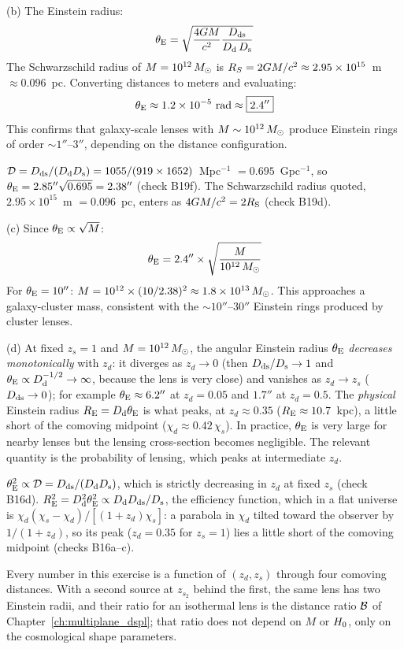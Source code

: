 (b) The Einstein radius:
\[
    \theta_{\mathrm{E}} = \sqrt{\frac{4G M}{c^2}
    \frac{D_{\mathrm{ds}}}{D_{\mathrm{d}}\,D_{\mathrm{s}}}}
\]
The Schwarzschild radius of $M = 10^{12}\,M_{\odot}$ is
$R_S = 2G M / c^2 \approx 2.95 \times 10^{15}$~m
$\approx 0.096$~pc.  Converting distances to meters and evaluating:
\[
    \theta_{\mathrm{E}} \approx 1.2 \times 10^{-5}~\text{rad}
    \approx \boxed{2.4''}
\]
This confirms that galaxy-scale lenses with $M \sim 10^{12}\,M_{\odot}$
produce Einstein rings of order $\sim 1''$--$3''$, depending on the
distance configuration.


\begin{derivation}
$\mathcal D = D_{\mathrm{ds}}/(D_{\mathrm{d}}D_{\mathrm{s}}) = 1055/(919\times1652)$~Mpc$^{-1}$ $= 0.695$~Gpc$^{-1}$,
so $\theta_{\mathrm{E}} = 2.85''\sqrt{0.695} = 2.38''$ (check B19f).  The Schwarzschild
radius quoted, $2.95\times10^{15}$~m $= 0.096$~pc, enters as
$4G M/c^2 = 2R_{\mathrm{S}}$ (check B19d).
\end{derivation}
(c) Since $\theta_{\mathrm{E}} \propto \sqrt{M}$:
\[
    \theta_{\mathrm{E}} = 2.4'' \times \sqrt{\frac{M}{10^{12}\,M_{\odot}}}
\]
For $\theta_{\mathrm{E}} = 10''$: $M = 10^{12} \times (10/2.38)^2 \approx
1.8 \times 10^{13}\,M_{\odot}$.
This approaches a galaxy-cluster mass, consistent with the
$\sim 10''$--$30''$ Einstein rings produced by cluster lenses.

(d) At fixed $z_s = 1$ and $M = 10^{12}\,M_{\odot}$, the angular
Einstein radius $\theta_{\mathrm{E}}$ \emph{decreases monotonically} with $z_d$: it
diverges as $z_d \to 0$ (then $D_{\mathrm{ds}}/D_{\mathrm{s}} \to 1$ and
$\theta_{\mathrm{E}} \propto D_{\mathrm{d}}^{-1/2} \to \infty$, because the lens is very close) and
vanishes as $z_d \to z_s$ ($D_{\mathrm{ds}} \to 0$); for example
$\theta_{\mathrm{E}} \approx 6.2''$ at $z_d = 0.05$ and $1.7''$ at $z_d = 0.5$.  The
\emph{physical} Einstein radius $R_{\mathrm{E}} = D_{\mathrm{d}}\theta_{\mathrm{E}}$ is what peaks, at
$z_d \approx 0.35$ ($R_{\mathrm{E}} \approx 10.7$~kpc), a little short of the comoving
midpoint ($\chi_d \approx 0.42\,\chi_s$).
In practice, $\theta_{\mathrm{E}}$ is very large for nearby lenses but the
lensing cross-section becomes negligible.  The relevant
quantity is the probability of lensing, which peaks at
intermediate $z_d$.

\begin{annotation}
$\theta_{\mathrm{E}}^2 \propto \mathcal D = D_{\mathrm{ds}}/(D_{\mathrm{d}}D_{\mathrm{s}})$, which is strictly decreasing in
$z_d$ at fixed $z_s$ (check B16d).  $R_{\mathrm{E}}^2 = D_{\mathrm{d}}^2\theta_{\mathrm{E}}^2 \propto
D_{\mathrm{d}}D_{\mathrm{ds}}/D_{\mathrm{s}}$, the efficiency function, which in a flat universe is
$\chi_d(\chi_s-\chi_d)/[(1+z_d)\chi_s]$: a parabola in $\chi_d$ tilted toward the
observer by $1/(1+z_d)$, so its peak ($z_d = 0.35$ for $z_s = 1$) lies a little
short of the comoving midpoint (checks B16a--c).
\end{annotation}

\begin{bridge}
Every number in this exercise is a function of $(z_d, z_s)$ through four
comoving distances.  With a second source at $z_{s_2}$ behind the first, the same
lens has two Einstein radii, and their ratio for an isothermal lens is the
distance ratio $\mathcal{B}$ of Chapter~\ref{ch:multiplane_dspl}; that ratio does not
depend on $M$ or $H_0$, only on the cosmological shape parameters.
\end{bridge}
